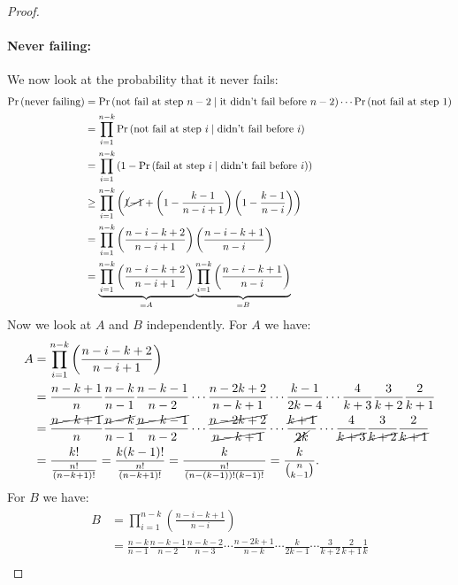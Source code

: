\documentclass[11pt]{article}
\begin{document}
\begin{enumerate}
\begin{proof}
        \paragraph*{Never failing:} We now look at the probability that it never fails:
        \begin{align*}
            \Pr\left(\text{never failing}\right) &= \Pr\left(\text{not fail at step $n-2$}\mid \text{it didn't fail before $n-2$}\right) \cdots \Pr\left(\text{not fail at step $1$}\right)\\
            &=\prod_{i=1}^{n-k}\Pr\left(\text{not fail at step $i$}\mid \text{didn't fail before $i$}\right)\\
            & = \prod_{i=1}^{n-k}\left(1-\Pr\left(\text{fail at step $i$}\mid \text{didn't fail before $i$}\right)\right)\\
            & \geq \prod_{i=1}^{n-k}\left(\cancel{1}\cancel{-1}+\left(1-\frac{k-1}{n-i+1}\right)\left(1-\frac{k-1}{n-i}\right)\right) \\
            & = \prod_{i=1}^{n-k}\left(\frac{n-i-k+2}{n-i+1}\right)\left(\frac{n-i-k+1}{n-i}\right) \\
            & = \underbrace{\prod_{i=1}^{n-k}\left(\frac{n-i-k+2}{n-i+1}\right)}_{=A}\underbrace{\prod_{i=1}^{n-k}\left(\frac{n-i-k+1}{n-i}\right)}_{=B}
        \end{align*}
        Now we look at $A$ and $B$ independently. For $A$ we have:
        \begin{align*}
            A &= \prod_{i=1}^{n-k}\left(\frac{n-i-k+2}{n-i+1}\right)\\
            &= \frac{n-k+1}{n}\frac{n-k}{n-1}\frac{n-k-1}{n-2}\cdots \frac{n-2k+2}{n-k+1}\cdots \frac{k-1}{2k-4}\cdots \frac{4}{k+3}\frac{3}{k+2}\frac{2}{k+1}\\
            &= \frac{\cancel{n-k+1}}{n}\frac{\cancel{n-k}}{n-1}\frac{\cancel{n-k-1}}{n-2}\cdots \frac{\cancel{n-2k+2}}{\cancel{n-k+1}}\cdots \frac{\cancel{k+1}}{\cancel{2k}}\cdots \frac{4}{\cancel{k+3}}\frac{3}{\cancel{k+2}}\frac{2}{\cancel{k+1}}\\
            &= \frac{k!}{\frac{n!}{(n-k+1)!}} = \frac{k(k-1)!}{\frac{n!}{(n-k+1)!}} = \frac{k}{\frac{n!}{(n-(k-1))!(k-1)!}}= \frac{k}{\binom{n}{k-1}}.
        \end{align*}
        For $B$ we have:
        \begin{align*}
            B & = \prod_{i=1}^{n-k}\left(\frac{n-i-k+1}{n-i}\right)\\
            &=\frac{n-k}{n-1}\frac{n-k-1}{n-2}\frac{n-k-2}{n-3}\cdots\frac{n-2k+1}{n-k}\cdots \frac{k}{2k-1}\cdots\frac{3}{k+2}\frac{2}{k+1}\frac{1}{k}\\

\end{align*}
\end{proof}
\end{enumerate}
\end{document}
